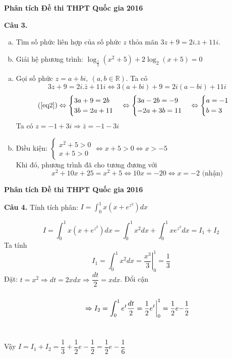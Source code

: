 \documentclass[11pt]{beamer} %
\newcommand{\cau}[2]{\begin{block}{}
		{\color{red}\textbf{Câu #1.}} #2
	\end{block}
}
\begin{document}
\begin{frame}{\textbf{\qquad Phân tích Đề thi THPT Quốc gia 2016}}
	\cau{3}{\begin{enumerate}[a)]
			\item Tìm số phức liên hợp của số phức $z$ thỏa mãn $3z+9=2i.\overline{z}+11i$.
			\item Giải hệ phương trình: $\log_{\frac{1}{2}} (x^2+5)+2\log_2(x+5)=0$
		\end{enumerate}}\pause
	\begin{enumerate}[a)]
		\item<+-|alert@+> Gọi số phức 
		$z=a+bi,~(a,b\in\mathbb{R})$. Ta có
		\begin{equation}\label{eq2}
		3z+9=2i.\bar{z}+11i\Leftrightarrow 3(a+bi)+9=2i(a-bi)+11i
		\end{equation}
		$$
		(\ref{eq2})\Leftrightarrow \begin{cases}
		3a+9=2b\\
		3b=2a+11
		\end{cases}\Leftrightarrow 
		\begin{cases}
		3a-2b=-9\\
		-2a+3b=11
		\end{cases}\Leftrightarrow\begin{cases}
		a=-1\\
		b=3
		\end{cases}
		$$
		Ta có $z=-1+3i\Rightarrow \bar{z}=-1-3i$
		\item<+-|alert@+>  Điều kiện: $\begin{cases}
		x^2+5>0\\
		x+5>0
		\end{cases}\Leftrightarrow x+5>0\Leftrightarrow x>-5$\\
		Khi đó, phương trình đã cho tương đương với
		$$x^2+10x+25=x^2+5\Leftrightarrow 10x=-20\Leftrightarrow x=-2 \mbox{ (nhận)}$$
	\end{enumerate}
\end{frame}

\begin{frame}{\textbf{\qquad Phân tích Đề thi THPT Quốc gia 2016}}
	\cau{4}{Tính tích phân: $I=\int_{0}^{1} x\left(x+e^{z^2}\right)dx$}\pause
	$$I=\int_{0}^{1} x\left(x+e^{z^2}\right)dx=\int_{0}^{1} x^2 dx+\int_{0}^{1}xe^{z^2}dx=I_1+I_2
	$$
	Ta tính
	$$I_1=\int_{0}^{1} x^2dx= \left.\frac{x^3}{3}\right|_0^1=\frac{1}{3}$$
	Đặt: $t=x^2\Rightarrow dt=2xdx\Rightarrow \dfrac{dt}{2}=xdx$. Đổi cận\\[-15pt]
	$$\begin{tabular}{cc}
		& \raisebox{-0.25cm}{\parbox[b]{5cm}{$$\Rightarrow I_2=\int_0^1 e^t\frac{dt}{2}=\frac{1}{2}\bigg.e^t\bigg|_0^1=\frac{1}{2}e-\frac{1}{2}$$}}
	\end{tabular}$$~\\[-10pt]
	Vậy $I=I_1+I_2=\dfrac{1}{3}+\dfrac{1}{2}e-\dfrac{1}{2}=\dfrac{1}{2}e-\dfrac{1}{6}$
\end{frame}
\end{document}

